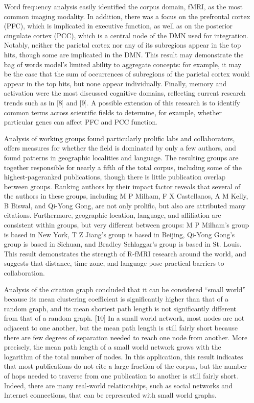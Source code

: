 \documentclass[12pt,3p]{elsarticle}
\begin{document}
Word frequency analysis easily identified the corpus domain, fMRI, as the most
common imaging modality. In addition, there was a focus on the prefrontal cortex
(PFC), which is implicated in executive function, as well as on the posterior
cingulate cortex (PCC), which is a central node of the DMN used for integration.
Notably, neither the parietal cortex nor any of its subregions appear in the top
hits, though some are implicated in the DMN. This result may demonstrate the bag
of words model’s limited ability to aggregate concepts: for example, it may be
the case that the sum of occurrences of subregions of the parietal cortex would
appear in the top hits, but none appear individually. Finally, memory and
activation were the most discussed cognitive domains, reflecting current
research trends such as in [8] and [9]. A possible extension of this research is
to identify common terms across scientific fields to determine, for example,
whether particular genes can affect PFC and PCC function.

Analysis of working groups found particularly prolific labs and collaborators,
offers measures for whether the field is dominated by only a few authors, and
found patterns in geographic localities and language. The resulting groups are
together responsible for nearly a fifth of the total corpus, including some of
the highest-pageranked publications, though there is little publication overlap
between groups. Ranking authors by their impact factor reveals that several of
the authors in these groups, including M P Milham, F X Castellanos, A M Kelly, B
Biswal, and Qi-Yong Gong, are not only prolific, but also are attributed many
citations. Furthermore, geographic location, language, and affiliation are
consistent within groups, but very different between groups: M P Milham’s group
is based in New York, T Z Jiang’s group is based in Beijing, Qi-Yong Gong’s
group is based in Sichuan, and Bradley Schlaggar’s group is based in St. Louis.
This result demonstrates the strength of R-fMRI research around the world, and
suggests that distance, time zone, and language pose practical barriers to
collaboration.

Analysis of the citation graph concluded that it can be considered ``small
world'' because its mean clustering coefficient is significantly higher than
that of a random graph, and its mean shortest path length is not significantly
different from that of a random graph. [10] In a small world network, most nodes
are not adjacent to one another, but the mean path length is still fairly short
because there are few degrees of separation needed to reach one node from
another. More precisely, the mean path length of a small world network grows
with the logarithm of the total number of nodes. In this application, this
result indicates that most publications do not cite a large fraction of the
corpus, but the number of hops needed to traverse from one publication to
another is still fairly short. Indeed, there are many real-world relationships,
such as social networks and Internet connections, that can be represented with
small world graphs. 
\end{document}

